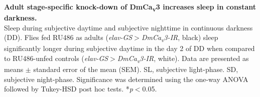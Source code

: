 \label{fig:S4}
\textbf{Adult stage-specific knock-down of DmCa\textsubscript{v}3 increases sleep in constant darkness.}
\\
Sleep during subjective daytime and subjective nighttime in continuous darkness (DD). 
Flies fed RU486 as adults (\emph{elav-GS$>$DmCa\textsubscript{v}3-IR}, black) sleep significantly longer during subjective daytime in the day 2 of DD when compared to RU486-unfed controls (\emph{elav-GS$>$DmCa\textsubscript{v}3-IR}, white).
Data are presented as means $\pm$ standard error of the mean (SEM).
SL, subjective light-phase.
SD, subjective night-phase.
Significance was determined using the one-way ANOVA followed by Tukey-HSD post hoc tests.
*\emph{p}$<$0.05.

  